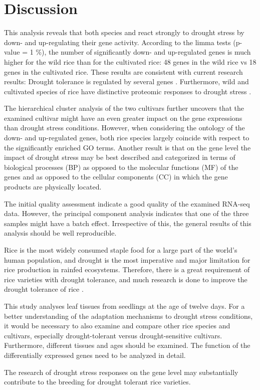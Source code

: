 \section{Discussion}

This analysis reveals that both species  and  react strongly to drought stress by down- and up-regulating their gene activity. According to the limma tests (p-value = 1 \%), the number of significantly down- and up-regulated genes is much higher for the wild rice than for the cultivated rice: 48 genes in the wild rice vs 18 genes in the cultivated rice. These results are consistent with current research results: Drought tolerance is regulated by several genes \autocite{10.3389/fpls.2016.01029}. Furthermore, wild and cultivated species of rice have distinctive proteomic responses to drought stress \autocite{10.3390/ijms21175980}.

The hierarchical cluster analysis of the two  cultivars further uncovers that the examined cultivar might have an even greater impact on the gene expressions than drought stress conditions. However, when considering the ontology of the down- and up-regulated genes, both rice species largely coincide with respect to the significantly enriched GO terms. Another result is that on the gene level the impact of drought stress may be best described and categorized in terms of biological processes (BP) as opposed to the molecular functions (MF) of the genes and as opposed to the cellular components (CC) in which the gene products are physically located.

The initial quality assessment indicate a good quality of the examined RNA-seq data. However, the principal component analysis indicates that one of the three  samples might have a batch effect. Irrespective of this, the general results of this analysis should be well reproducible.

Rice is the most widely consumed staple food for a large part of the world's human population, and drought is the most imperative and major limitation for rice production in rainfed ecosystems. Therefore, there is a great requirement of rice varieties with drought tolerance, and much research is done to improve the drought tolerance of rice \autocite{10.1016/j.rsci.2021.01.002}.

This study analyses leaf tissues from seedlings at the age of twelve days. For a better understanding of the adaptation mechanisms to drought stress conditions, it would be necessary to also examine and compare other rice species and cultivars, especially drought-tolerant versus drought-sensitive cultivars. Furthermore, different tissues and ages should be examined. The function of the differentially expressed genes need to be analyzed in detail.

The research of drought stress responses on the gene level may substantially contribute to the breeding for drought tolerant rice varieties.